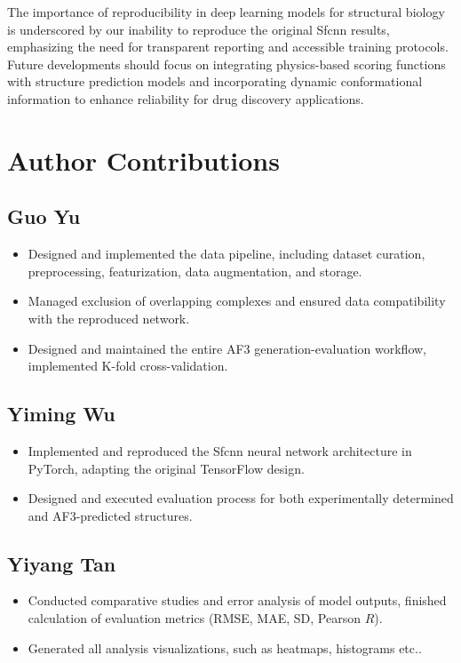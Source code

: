 \documentclass[unnumsec,webpdf,contemporary,large]{oup-authoring-template}
\theoremstyle{thmstyleone}%
\theoremstyle{thmstyletwo}%
\theoremstyle{thmstylethree}%
\begin{document}
The importance of reproducibility in deep learning models for structural biology is underscored 
by our inability to reproduce the original Sfcnn results, emphasizing the need for transparent 
reporting and accessible training protocols. Future developments should focus on integrating 
physics-based scoring functions with structure prediction models and incorporating dynamic 
conformational information to enhance reliability for drug discovery applications.


\section{Author Contributions}

\subsection{Guo Yu}
\begin{itemize}
    \item Designed and implemented the data pipeline, including dataset curation, preprocessing, featurization, data augmentation, and storage.
    \item Managed exclusion of overlapping complexes and ensured data compatibility with the reproduced network.
    \item Designed and maintained the entire AF3 generation-evaluation workflow, implemented K-fold cross-validation.
\end{itemize}

\subsection{Yiming Wu}
\begin{itemize}
    \item Implemented and reproduced the Sfcnn neural network architecture in PyTorch, adapting the original TensorFlow design.
    \item Designed and executed evaluation process for both experimentally determined and AF3-predicted structures.
\end{itemize}

\subsection{Yiyang Tan}
\begin{itemize}
    \item Conducted comparative studies and error analysis of model outputs, finished calculation of evaluation metrics (RMSE, MAE, SD, Pearson $R$).
    \item Generated all analysis visualizations, such as heatmaps, histograms etc..
\end{itemize}
\end{document}

